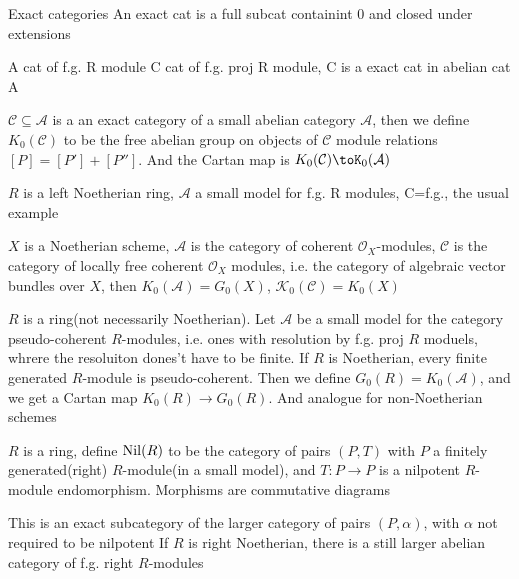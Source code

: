 \documentclass[main]{subfiles}
\begin{document}
\iffalse

Exact categories
An exact cat is a full subcat containint 0 and closed under extensions

\begin{example}
A cat of f.g. R module
C cat of f.g. proj R module, C is a exact cat in abelian cat A
\end{example}

\begin{definition}
$\mathcal C\subseteq\mathcal A$ is a an exact category of a small abelian category $\mathcal A$, then we define $K_0(\mathcal C)$ to be the free abelian group on objects of $\mathcal C$ module relations $[P]=[P']+[P'']$. And the Cartan map is $K_0(\mathcal C)\toK_0(\mathcal A)$
\end{definition}

\begin{example}
$R$ is a left Noetherian ring, $\mathcal A$ a small model for f.g. R modules, C=f.g., the usual example
\end{example}

\begin{example}
$X$ is a Noetherian scheme, $\mathcal A$ is the category of coherent $\mathcal O_X$-modules, $\mathcal C$ is the category of locally free coherent $\mathcal O_X$ modules, i.e. the category of algebraic vector bundles over $X$, then $K_0(\mathcal A)=G_0(X)$, $\mathcal K_0(\mathcal C)=K_0(X)$
\end{example}

\begin{example}
$R$ is a ring(not necessarily Noetherian). Let $\mathcal A$ be a small model for the category pseudo-coherent $R$-modules, i.e. ones with resolution by f.g. proj $R$ moduels, whrere the resoluiton dones't have to be finite. If $R$ is Noetherian, every finite generated $R$-module is pseudo-coherent. Then we define $G_0(R)=K_0(\mathcal A)$, and we get a Cartan map $K_0(R)\to G_0(R)$. And analogue for non-Noetherian schemes
\end{example}

\begin{example}
$R$ is a ring, define $\operatorname{Nil}(R)$ to be the category of pairs $(P,T)$ with $P$ a finitely generated(right) $R$-module(in a small model), and $T:P\to P$ is a nilpotent $R$-module endomorphism. Morphisms are commutative diagrams
\begin{center}
\end{center}
This is an exact subcategory of the larger category of pairs $(P,\alpha)$, with $\alpha$ not required to be nilpotent
If $R$ is right Noetherian, there is a still larger abelian category of f.g. right $R$-modules
\end{example}
\end{document}
